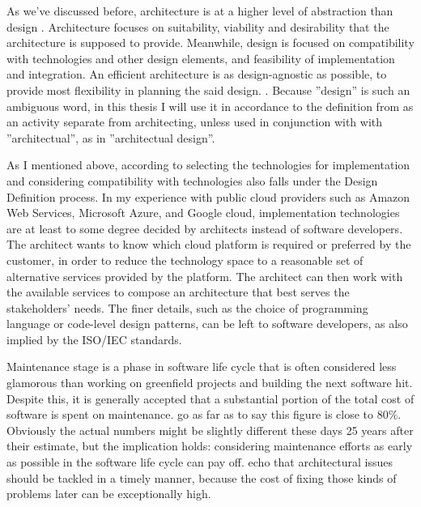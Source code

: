 \documentclass[utf8,english]{gradu3}
\begin{document}
As we've discussed before, architecture is at a higher level of abstraction than
design \parencite{IEEE12207}. Architecture focuses on suitability, viability and
desirability that the architecture is supposed to provide. Meanwhile, design is
focused on compatibility with technologies and other design elements, and
feasibility of implementation and integration. An efficient architecture is as
design-agnostic as possible, to provide most flexibility in planning the said
design. \parencite[71]{IEEE12207}. Because ''design'' is such an ambiguous word,
in this thesis I will use it in accordance to the definition from
\textcite{IEEE12207} as an activity separate from architecting, unless used in
conjunction with with ''architectual'', as in ''architectual design''.

As I mentioned above, according to \textcite[71-72]{IEEE12207} selecting the technologies for
implementation and considering compatibility with technologies also falls under
the Design Definition process. In my experience with public cloud providers such
as Amazon Web Services, Microsoft Azure, and Google cloud, implementation
technologies are at least to some degree decided by architects instead of
software developers. The architect wants to know which cloud platform is
required or preferred by the customer, in order to reduce the technology space
to a reasonable set of alternative services provided by the platform. The
architect can then work with the available services to compose an architecture
that best serves the stakeholders' needs. The finer details, such as the choice
of programming language or code-level design patterns, can be left to software
developers, as also implied by the ISO/IEC standards.

Maintenance stage is a phase in software life cycle that is often
considered less glamorous than working on greenfield projects and building the
next software hit. Despite this, it is generally accepted that a substantial
portion of the total cost of software is spent on maintenance.
\textcite[32]{Bass1998} go as far as to say this figure is close to 80\%.
Obviously the actual numbers might be slightly different these days 25 years
after their estimate, but the implication holds: considering maintenance efforts
as early as possible in the software life cycle can pay off.
\textcite[1]{Mumtaz2021} echo that architectural issues should be tackled in a
timely manner, because the cost of fixing those kinds of problems later can be
exceptionally high.
\end{document}
